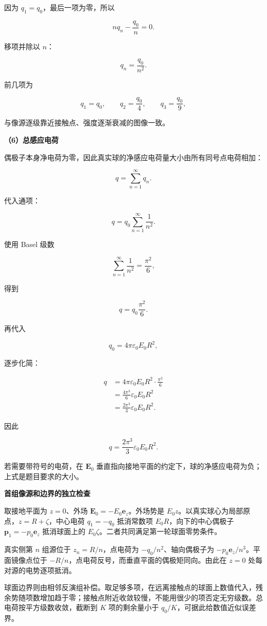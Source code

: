 \documentclass[12pt,a4paper,UTF8]{ctexart}
\begin{document}
因为 \(q_1=q_0\)，最后一项为零，所以

\[nq_n-\frac{q_0}{n}=0.\]

移项并除以 \(n\)：

\[\boxed{q_n=\frac{q_0}{n^2}}.\]

前几项为

\[q_1=q_0,\qquad
q_2=\frac{q_0}{4},\qquad
q_3=\frac{q_0}{9},\]

与像源逐级靠近接触点、强度逐渐衰减的图像一致。

\textbf{（6）总感应电荷}

偶极子本身净电荷为零，因此真实球的净感应电荷量大小由所有同号点电荷相加：

\[q=\sum_{n=1}^{\infty}q_n.\]

代入通项：

\[q=q_0\sum_{n=1}^{\infty}\frac1{n^2}.\]

使用 Basel 级数

\[\sum_{n=1}^{\infty}\frac1{n^2}=\frac{\pi^2}{6},\]

得到

\[q=q_0\frac{\pi^2}{6}.\]

再代入

\[q_0=4\pi\varepsilon_0E_0R^2,\]

逐步化简：

\[\begin{aligned}
q
&=4\pi\varepsilon_0E_0R^2
\cdot\frac{\pi^2}{6}\\
&=\frac{4\pi^3}{6}
\varepsilon_0E_0R^2\\
&=\frac{2\pi^3}{3}
\varepsilon_0E_0R^2.
\end{aligned}\]

因此

\[\boxed{
q=\frac{2\pi^3}{3}\varepsilon_0E_0R^2
}.\]

若需要带符号的电荷，在 \(\bm E_0\)
垂直指向接地平面的约定下，球的净感应电荷为负；上式是题目要求的大小。

\textbf{首组像源和边界的独立检查}

取接地平面为 \(z=0\)、外场 \(\bm E_0=-E_0\bm e_z\)。外场势是
\(E_0z\)。以真实球心为局部原点，\(z=R+\zeta\)，中心电荷 \(q_1=-q_0\)
抵消常数项 \(E_0R\)，向下的中心偶极子 \(\bm p_1=-p_0\bm e_z\)
抵消球面上的 \(E_0\zeta\)。二者共同满足第一轮球面零势条件。

真实侧第 \(n\) 组源位于 \(z_n=R/n\)，点电荷为 \(-q_0/n^2\)、轴向偶极子为
\(-p_0\bm e_z/n^3\)。平面镜像点位于
\(-R/n\)，点电荷反号，而垂直平面的偶极矩同向。由此在 \(z=0\)
处每对源的电势逐项抵消。

球面边界则由相邻反演组补偿。取足够多项，在远离接触点的球面上数值代入，残余势随项数增加趋于零；接触点附近收敛较慢，不能用很少的项否定无穷级数。总电荷按平方级数收敛，截断到
\(K\) 项的剩余量小于 \(q_0/K\)，可据此给数值近似误差界。
\end{document}
